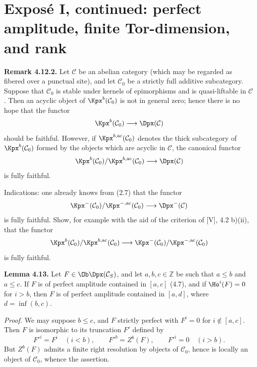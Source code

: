 \documentclass[11pt]{article}
\begin{document}
\providecommand{\Add}{\operatorname{Add}}
\providecommand{\Cart}{\operatorname{Cart}}
\providecommand{\perfamp}{\operatorname{perf.amp}}
\providecommand{\perfdim}{\operatorname{perf.dim}}
\providecommand{\toramp}{\operatorname{tor.amp}}
\providecommand{\torf}{\operatorname{torf}}
\providecommand{\injf}{\operatorname{injf}}
\providecommand{\rg}{\operatorname{rg}}
\providecommand{\is}{\mathrm{is}}
\providecommand{\Mod}{\operatorname{Mod}}


\section*{Exposé I, continued: perfect amplitude, finite Tor-dimension, and rank}

\textbf{Remark 4.12.2.} Let \(\mathcal C\) be an abelian category (which may be regarded as fibered over a punctual site), and let \(\mathcal C_0\) be a strictly full additive subcategory. Suppose that \(\mathcal C_0\) is stable under kernels of epimorphisms and is quasi-liftable in \(\mathcal C\). Then an acyclic object of \(\Kpx^b(\mathcal C_0)\) is not in general zero; hence there is no hope that the functor
\[
  \Kpx^b(\mathcal C_0)\longrightarrow \Dpx(\mathcal C)
\]
should be faithful. However, if \(\Kpx^{b,\mathrm{ac}}(\mathcal C_0)\) denotes the thick subcategory of \(\Kpx^b(\mathcal C_0)\) formed by the objects which are acyclic in \(\mathcal C\), the canonical functor
\[
  \Kpx^b(\mathcal C_0)/\Kpx^{b,\mathrm{ac}}(\mathcal C_0)
  \longrightarrow \Dpx(\mathcal C)
\]
is fully faithful.

Indications: one already knows from (2.7) that the functor
\[
  \Kpx^-(\mathcal C_0)/\Kpx^{-,\mathrm{ac}}(\mathcal C_0)
  \longrightarrow \Dpx^-(\mathcal C)
\]
is fully faithful. Show, for example with the aid of the criterion of [V], 4.2 b)(ii), that the functor
\[
  \Kpx^b(\mathcal C_0)/\Kpx^{b,\mathrm{ac}}(\mathcal C_0)
  \longrightarrow
  \Kpx^-(\mathcal C_0)/\Kpx^{-,\mathrm{ac}}(\mathcal C_0)
\]
is fully faithful.

\textbf{Lemma 4.13.} Let \(F\in\Ob \Dpx(\mathcal C_S)\), and let \(a,b,c\in\mathbb Z\) be such that \(a\leq b\) and \(a\leq c\). If \(F\) is of perfect amplitude contained in \([a,c]\) (4.7), and if \(\Ho^i(F)=0\) for \(i>b\), then \(F\) is of perfect amplitude contained in \([a,d]\), where \(d=\inf(b,c)\).

\emph{Proof.} We may suppose \(b\leq c\), and \(F\) strictly perfect with \(F^i=0\) for \(i\notin [a,c]\). Then \(F\) is isomorphic to its truncation \(F'\) defined by
\[
  F'^i=F^i\quad (i<b),\qquad F'^b=Z^b(F),\qquad F'^i=0\quad (i>b).
\]
But \(Z^b(F)\) admits a finite right resolution by objects of \(\mathcal C_0\), hence is locally an object of \(\mathcal C_0\), whence the assertion.
\end{document}
